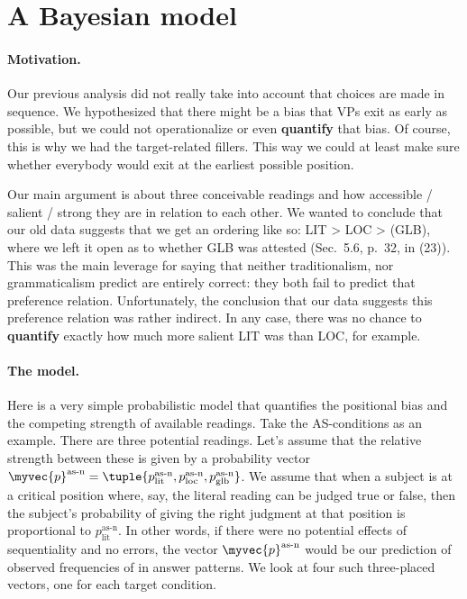 \documentclass[fleqn,reqno,10pt]{article}
\begin{document}
\section{A Bayesian model}

\paragraph{Motivation.} Our previous analysis did not really take into
account that choices are made in sequence. We hypothesized that there
might be a bias that VPs exit as early as possible, but we could not
operationalize or even \textbf{quantify} that bias. Of course, this is why we
had the target-related fillers. This way we could at least make sure
whether everybody would exit at the earliest possible position.

Our main argument is about three conceivable readings and how
accessible / salient / strong they are in relation to each other. We
wanted to conclude that our old data suggests that we get an ordering
like so: LIT > LOC > (GLB), where we left it open as to whether GLB
was attested (Sec.~5.6, p.~32, in (23)). This was the main leverage
for saying that neither traditionalism, nor grammaticalism predict are
entirely correct: they both fail to predict that preference
relation. Unfortunately, the conclusion that our data suggests this
preference relation was rather indirect. In any case, there was no
chance to \textbf{quantify} exactly how much more salient LIT was than
LOC, for example.

\paragraph{The model.} Here is a very simple probabilistic model that
quantifies the positional bias and the competing strength of available
readings. Take the AS-conditions as an example. There are three
potential readings. Let's assume that the relative strength between
these is given by a probability vector $\myvec{p}^\text{as-n} =
\tuple{p^\text{as-n}_{\text{lit}},p^\text{as-n}_{\text{loc}},p^\text{as-n}_{\text{glb}}}$. We
assume that when a subject is at a critical position where, say, the
literal reading can be judged true or false, then the subject's
probability of giving the right judgment at that position is
proportional to $p^\text{as-n}_{\text{lit}}$. In other words, if there
were no potential effects of sequentiality and no errors, the vector
$\myvec{p}^\text{as-n}$ would be our prediction of observed
frequencies of in answer patterns. We look at four such three-placed
vectors, one for each target condition.
\end{document}
